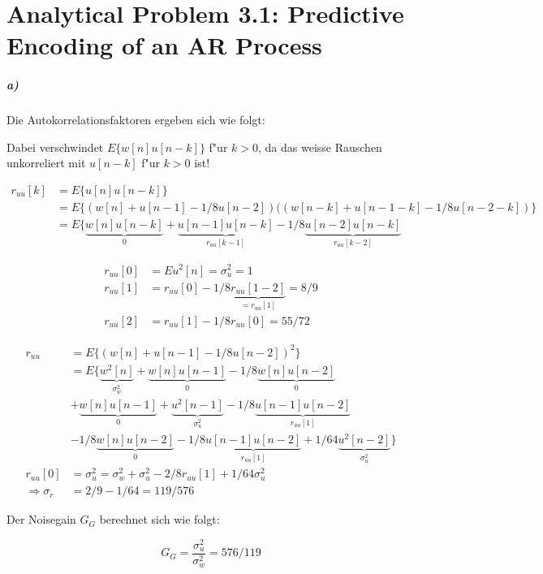 \chapter{Analytical Problem 3.1: Predictive Encoding of an AR Process}

\paragraph{a)}

Die Autokorrelationsfaktoren ergeben sich wie folgt:

Dabei verschwindet $E\{w[n]u[n-k]\}$ f"ur $k>0$, da das weisse Rauschen unkorreliert mit $u[n-k]$ f"ur $k>0$ ist!

\begin{align}
r_{uu}[k] &= E\{u[n]u[n-k]\}\\
&= E\{(w[n]+u[n-1]-1/8u[n-2])((w[n-k]+u[n-1-k]-1/8u[n-2-k])\} \\
&= E\{\underbrace{w[n]u[n-k]}_0 + \underbrace{u[n-1]u[n-k]}_{r_{uu}[k-1]} - 1/8\underbrace{u[n-2]u[n-k]}_{r_{uu}[k-2]}
\end{align}

\begin{align}
r_{uu}[0] &= E{u^2[n]} = \sigma_u^2 = 1 \\
r_{uu}[1] &= r_{uu}[0] - 1/8\underbrace{r_{uu}[1-2]}_{=r_{uu}[1]} = 8/9 \\
r_{uu}[2] &=  r_{uu}[1] - 1/8r_{uu}[0] = 55/72
\end{align}

\begin{align}
 r_{uu} &= E\{(w[n]+u[n-1]-1/8u[n-2])^2\} \\
 &= E\{\underbrace{w^2[n]}_{\sigma_w^2}+\underbrace{w[n]u[n-1]}_{0}-1/8\underbrace{w[n]u[n-2]}_{0} \\
 &+\underbrace{w[n]u[n-1]}_{0} + \underbrace{u^2[n-1]}_{\sigma_u^2} -1/8\underbrace{u[n-1]u[n-2]}_{r_{uu}[1]} \\
 &-1/8\underbrace{w[n]u[n-2]}_{0} - 1/8\underbrace{u[n-1]u[n-2]}_{r_{uu}[1]} + 1/64\underbrace{u^2[n-2]}_{\sigma_u^2} \} \\
r_{uu}[0] &= \sigma_u^2 = \sigma_w^2 + \sigma_u^2 - 2/8r_{uu}[1] + 1/64\sigma_u^2 \\
 \Rightarrow \sigma_r &= 2/9 - 1/64 = 119/576
\end{align}

Der Noisegain $G_G$ berechnet sich wie folgt:

\begin{equation}
 G_G = \frac{\sigma_u^2}{\sigma_w^2} = 576/119
\end{equation}

